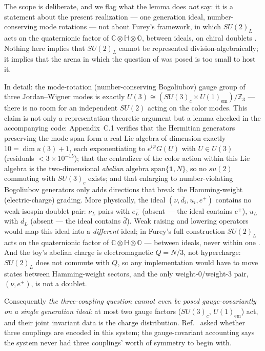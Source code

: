 \documentclass[11pt]{article}
\newcommand{\CC}{\mathbb{C}}
\begin{document}
\medskip

The scope is deliberate, and we flag what the lemma does \emph{not} say: it is a statement about the present realization --- one generation ideal, number-conserving mode rotations --- not about Furey's framework, in which $SU(2)_L$ acts on the quaternionic factor of $\CC \otimes \mathbb{H} \otimes \mathbb{O}$, between ideals, on chiral doublets \cite{furey18}. Nothing here implies that $SU(2)_L$ cannot be represented division-algebraically; it implies that the arena in which the question of \cite{companion} was posed is too small to host it.

In detail: the mode-rotation (number-conserving Bogoliubov) gauge group of three Jordan--Wigner modes is exactly $U(3) \cong (SU(3)_c \times U(1)_{\mathrm{em}})/\mathbb{Z}_3$ --- there is no room for an independent $SU(2)$ acting on the color modes. This claim is not only a representation-theoretic argument but a lemma checked in the accompanying code: Appendix~C.1 verifies that the Hermitian generators preserving the mode span form a real Lie algebra of dimension exactly $10 = \dim u(3) + 1$, each exponentiating to $e^{i\varphi}G(U)$ with $U \in U(3)$ (residuals $< 3 \times 10^{-15}$); that the centralizer of the color action within this Lie algebra is the two-dimensional \emph{abelian} algebra $\mathrm{span}\{\mathbf{1}, N\}$, so no $su(2)$ commuting with $SU(3)_c$ exists; and that enlarging to number-violating Bogoliubov generators only adds directions that break the Hamming-weight (electric-charge) grading. More physically, the ideal $(\nu, \bar d_i, u_i, e^+)$ contains no weak-isospin doublet pair: $\nu_L$ pairs with $e^-_L$ (absent --- the ideal contains $e^+$), $u_L$ with $d_L$ (absent --- the ideal contains $\bar d$). Weak raising and lowering operators would map this ideal into a \emph{different} ideal; in Furey's full construction $SU(2)_L$ acts on the quaternionic factor of $\CC \otimes \mathbb{H} \otimes \mathbb{O}$ --- between ideals, never within one \cite{furey18}. And the toy's abelian charge is electromagnetic $Q = N/3$, not hypercharge: $SU(2)_L$ does not commute with $Q$, so any implementation would have to move states between Hamming-weight sectors, and the only weight-0/weight-3 pair, $(\nu, e^+)$, is not a doublet.

Consequently \emph{the three-coupling question cannot even be posed gauge-covariantly on a single generation ideal}: at most two gauge factors ($SU(3)_c$, $U(1)_{\mathrm{em}}$) act, and their joint invariant data is the charge distribution. Ref.~\cite{companion} asked whether three couplings are encoded in this system; the gauge-covariant accounting says the system never had three couplings' worth of symmetry to begin with.
\end{document}
